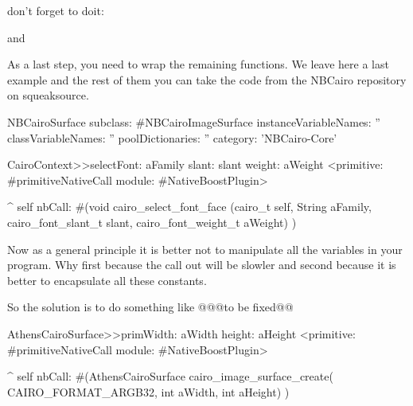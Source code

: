 \documentclass[a4paper,10pt,twoside]{book}
\begin{document}
don't forget to doit:


and


As a last step, you need to wrap the remaining functions.
We leave here a last example and the rest of them you can
take the code from the NBCairo repository on squeaksource.

\begin{classdef}{}
NBCairoSurface subclass: #NBCairoImageSurface
	instanceVariableNames: ''
	classVariableNames: ''
	poolDictionaries: ''
	category: 'NBCairo-Core'
\end{classdef}

\begin{code}{}
CairoContext>>selectFont: aFamily slant: slant weight: aWeight
	<primitive: #primitiveNativeCall module: #NativeBoostPlugin>
	
	^ self nbCall: #(void cairo_select_font_face (cairo_t self,
                                                         String aFamily,
                                                         cairo_font_slant_t slant,
                                                         cairo_font_weight_t aWeight) )
\end{code}


Now as a general principle it is better not to manipulate all the
variables in your program. Why first because the call out will be
slowler and second because it is better to encapsulate all these
constants. 

So the solution is to do something like
@@@to be fixed@@
\begin{code}{}
AthensCairoSurface>>primWidth: aWidth height: aHeight
	<primitive: #primitiveNativeCall module: #NativeBoostPlugin>
	
	^ self nbCall: #(AthensCairoSurface cairo_image_surface_create(
				CAIRO_FORMAT_ARGB32,
					int aWidth,
					int aHeight) )
	
\end{code}
\end{document}
